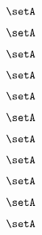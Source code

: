 \begin{forslides}
    \begin{equation}
        \label{eq:combination-179}
       \setA
    \end{equation}
    
       \begin{equation}
        \label{eq:combination-180}
        \setA
    \end{equation}
       
     \begin{equation}
        \label{eq:combination-181}
        \setA
    \end{equation}
    
     \begin{equation}
        \label{eq:combination-182}
        \setA
    \end{equation}
    
    \begin{equation}
        \label{eq:combination-183}
        \setA
    \end{equation}
    
     \begin{equation}
        \label{eq:combination-184}
        \setA
    \end{equation}
    
     \begin{equation}
        \label{eq:combination-185}
        \setA
    \end{equation}
    
    \begin{equation}
        \label{eq:combination-186}
        \setA
    \end{equation}
    
     \begin{equation}
        \label{eq:combination-187}
        \setA
    \end{equation}
    
     \begin{equation}
        \label{eq:combination-188}
        \setA
    \end{equation}
    
    \begin{equation}
        \label{eq:combination-189}
       \setA
    \end{equation}

    

    



\end{forslides}